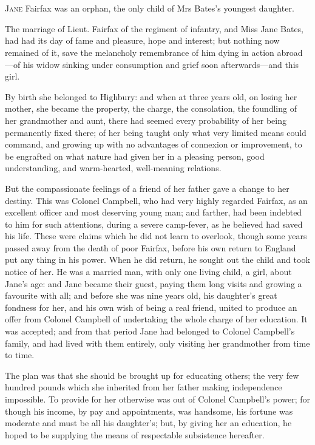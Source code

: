 \chapter[Chapter \thechapter]{}
\lettrine[lraise=0.3]{J}{ane} Fairfax was an orphan, the only child of Mrs Bates's youngest daughter.

\zz
The marriage of Lieut. Fairfax of the \doubleemdash regiment of infantry, and Miss Jane Bates, had had its day of fame and pleasure, hope and interest; but nothing now remained of it, save the melancholy remembrance of him dying in action abroad—of his widow sinking under consumption and grief soon afterwards—and this girl.

By birth she belonged to Highbury: and when at three years old, on losing her mother, she became the property, the charge, the consolation, the foundling of her grandmother and aunt, there had seemed every probability of her being permanently fixed there; of her being taught only what very limited means could command, and growing up with no advantages of connexion or improvement, to be engrafted on what nature had given her in a pleasing person, good understanding, and warm-hearted, well-meaning relations.

But the compassionate feelings of a friend of her father gave a change to her destiny. This was Colonel Campbell, who had very highly regarded Fairfax, as an excellent officer and most deserving young man; and farther, had been indebted to him for such attentions, during a severe camp-fever, as he believed had saved his life. These were claims which he did not learn to overlook, though some years passed away from the death of poor Fairfax, before his own return to England put any thing in his power. When he did return, he sought out the child and took notice of her. He was a married man, with only one living child, a girl, about Jane's age: and Jane became their guest, paying them long visits and growing a favourite with all; and before she was nine years old, his daughter's great fondness for her, and his own wish of being a real friend, united to produce an offer from Colonel Campbell of undertaking the whole charge of her education. It was accepted; and from that period Jane had belonged to Colonel Campbell's family, and had lived with them entirely, only visiting her grandmother from time to time.

The plan was that she should be brought up for educating others; the very few hundred pounds which she inherited from her father making independence impossible. To provide for her otherwise was out of Colonel Campbell's power; for though his income, by pay and appointments, was handsome, his fortune was moderate and must be all his daughter's; but, by giving her an education, he hoped to be supplying the means of respectable subsistence hereafter.

